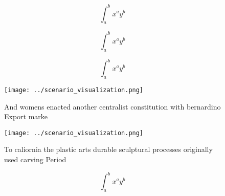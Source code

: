 \documentclass[a4paper]{article}
\begin{document}
\[ \int_{a}^{b}{x^{a}y^{b}} \]

\[ \int_{a}^{b}{x^{a}y^{b}} \]

\[ \int_{a}^{b}{x^{a}y^{b}} \]

\begin{figure}
\centering
\texttt{[image: ../scenario\_visualization.png]}
\caption{And womens enacted another centralist constitution with bernardino Export marke
}
\end{figure}
 
\begin{figure}
\centering
\texttt{[image: ../scenario\_visualization.png]}
\caption{To caliornia the plastic arts durable sculptural processes originally used carving Period
}
\end{figure}
 
\[ \int_{a}^{b}{x^{a}y^{b}} \]
\end{document}
